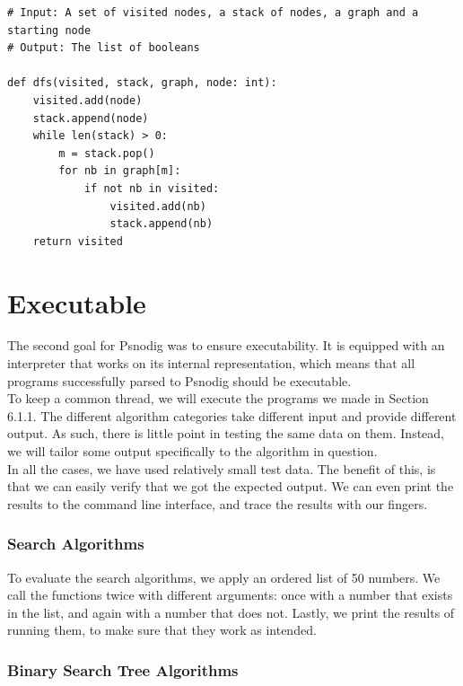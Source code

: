 \begin{lstlisting}[caption={The result of transpiling \Cref{dfsGourmet} to Python.}, captionpos=b, label={dfsPython}]
# Input: A set of visited nodes, a stack of nodes, a graph and a starting node
# Output: The list of booleans

def dfs(visited, stack, graph, node: int):
    visited.add(node)
    stack.append(node)
    while len(stack) > 0:
        m = stack.pop()
        for nb in graph[m]:
            if not nb in visited:
                visited.add(nb)
                stack.append(nb)
    return visited
\end{lstlisting}

\section{Executable}

The second goal for Psnodig was to ensure executability. It is equipped with an interpreter that works on its internal representation, which means that all programs successfully parsed to Psnodig should be executable. \\

To keep a common thread, we will execute the programs we made in Section 6.1.1. The different algorithm categories take different input and provide different output. As such, there is little point in testing the same data on them. Instead, we will tailor some output specifically to the algorithm in question. \\

In all the cases, we have used relatively small test data. The benefit of this, is that we can easily verify that we got the expected output. We can even print the results to the command line interface, and trace the results with our fingers.

\subsubsection{Search Algorithms}

To evaluate the search algorithms, we apply an ordered list of 50 numbers. We call the functions twice with different arguments: once with a number that exists in the list, and again with a number that does not. Lastly, we print the results of running them, to make sure that they work as intended.

\subsubsection{Binary Search Tree Algorithms}


